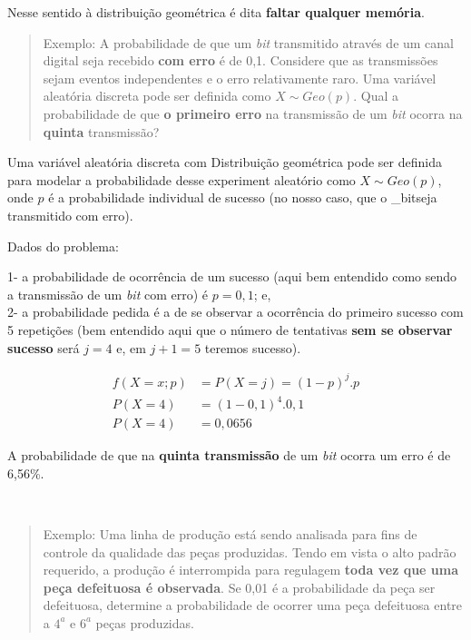 \documentclass[
]{book}
\begin{document}
\hfill\break

Nesse sentido à distribuição geométrica é dita \textbf{faltar qualquer memória}.

\hfill\break

\begin{quote}
Exemplo: A probabilidade de que um \emph{bit} transmitido através de um canal digital seja recebido \textbf{com erro} é de 0,1. Considere que as transmissões sejam eventos independentes e o erro relativamente raro. Uma variável aleatória discreta pode ser definida como \(X\sim Geo(p)\). Qual a probabilidade de que \textbf{o primeiro erro} na transmissão de um \emph{bit} ocorra na \textbf{quinta} transmissão?
\end{quote}

\hfill\break

Uma variável aleatória discreta com Distribuição geométrica pode ser definida para modelar a probabilidade desse experiment aleatório como \(X\sim Geo(p)\), onde \(p\) é a probabilidade individual de sucesso (no nosso caso, que o \_bitseja transmitido com erro).

\hfill\break

Dados do problema:

1- a probabilidade de ocorrência de um sucesso (aqui bem entendido como sendo a transmissão de um \emph{bit} com erro) é \(p=0,1\); e,\\
2- a probabilidade pedida é a de se observar a ocorrência do primeiro sucesso com 5 repetições (bem entendido aqui que o número de tentativas \textbf{sem se observar sucesso} será \(j=4\) e, em \(j+1=5\) teremos sucesso).

\hfill\break

\begin{align*}
f(X=x; p) & = P(X=j) = (1-p)^{j} .  p \\
P(X=4) & = (1-0,1)^{4} . 0,1 \\
P(X=4) & = 0,0656
\end{align*}

\hfill\break

A probabilidade de que na \textbf{quinta transmissão} de um \emph{bit} ocorra um erro é de 6,56\%.

~

\begin{quote}
Exemplo: Uma linha de produção está sendo analisada para fins de controle da qualidade das peças produzidas. Tendo em vista o alto padrão requerido, a produção é interrompida para regulagem \textbf{toda vez que uma peça defeituosa é observada}. Se 0,01 é a probabilidade da peça ser defeituosa, determine a probabilidade de ocorrer uma peça defeituosa entre a \(4^{a}\) e \(6^{a}\) peças produzidas.
\end{quote}
\end{document}
